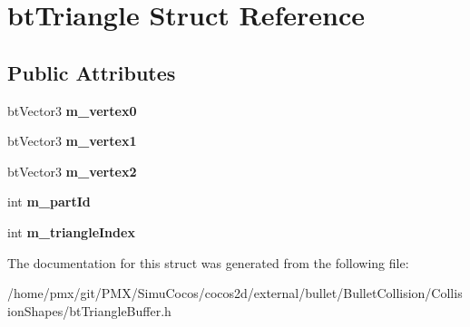 \hypertarget{structbtTriangle}{}\section{bt\+Triangle Struct Reference}
\label{structbtTriangle}
\subsection*{Public Attributes}
\begin{DoxyCompactItemize}
\item 
\mbox{\label{structbtTriangle_a42fbabffa2712410a3415b3ad36e87f0}} 
bt\+Vector3 {\bfseries m\+\_\+vertex0}
\item 
\mbox{\label{structbtTriangle_aba504f74cd6283a0fae97ebbf4404952}} 
bt\+Vector3 {\bfseries m\+\_\+vertex1}
\item 
\mbox{\label{structbtTriangle_a7e26ce3c98ef6387d116794843a5ddf7}} 
bt\+Vector3 {\bfseries m\+\_\+vertex2}
\item 
\mbox{\label{structbtTriangle_af5554c2e94da692fcabff95d54cf2134}} 
int {\bfseries m\+\_\+part\+Id}
\item 
\mbox{\label{structbtTriangle_ad4507b034ae276b0d7ba0bb79489bbec}} 
int {\bfseries m\+\_\+triangle\+Index}
\end{DoxyCompactItemize}


The documentation for this struct was generated from the following file\+:\begin{DoxyCompactItemize}
\item 
/home/pmx/git/\+P\+M\+X/\+Simu\+Cocos/cocos2d/external/bullet/\+Bullet\+Collision/\+Collision\+Shapes/bt\+Triangle\+Buffer.\+h\end{DoxyCompactItemize}
